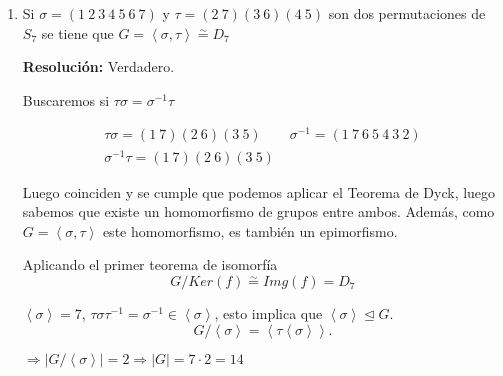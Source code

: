 \documentclass{article}
\begin{document}
\begin{enumerate}
\item Si $\sigma=(1\:2\:3\:4\:5\:6\:7)$ y $\tau=(2\:7)(3\:6)(4\:5)$ son dos permutaciones de $S_7$ se tiene que $G=\left\langle \sigma,\tau\right\rangle \overset{\sim}{=} D_7$

\textbf{Resolución:} Verdadero.

Buscaremos si $\tau\sigma =\sigma^{-1}\tau$

\begin{gather*}
\tau\sigma=(1\:7)(2\:6)(3\:5)\qquad \sigma^{-1}=(1\:7\:6\:5\:4\:3\:2)\\
\sigma^{-1}\tau=(1\:7)(2\:6)(3\:5)
\end{gather*}

Luego coinciden y se cumple que podemos aplicar el Teorema de Dyck, luego sabemos que existe un homomorfismo de grupos entre ambos. Además, como $G=\left\langle \sigma,\tau\right\rangle$ este homomorfismo, es también un epimorfismo. 

Aplicando el primer teorema de isomorfía
\begin{equation*}
G/Ker(f)\overset{\sim}{=} Img(f)=D_7
\end{equation*}

$\left\langle \sigma \right\rangle =7$, $\tau \sigma \tau^{-1}=\sigma^{-1}\in \left\langle\sigma\right\rangle$, esto implica que $\left\langle \sigma\right\rangle\unlhd G$.
\begin{equation*}
G/\left\langle\sigma\right\rangle=\left\langle\tau\left\langle\sigma\right\rangle\right\rangle.
\end{equation*}

$\Rightarrow |G/\left\langle\sigma\right\rangle|=2\Rightarrow |G|=7\cdot 2=14$


\end{enumerate}
\end{document}
